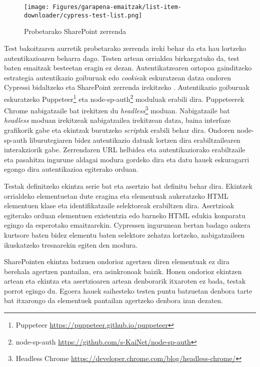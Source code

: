 \begin{figure}[H]
\vspace{0.75cm}
\centering
\texttt{[image: Figures/garapena-emaitzak/list-item-downloader/cypress-test-list.png]}
\caption{Probetarako SharePoint zerrenda}
\label{cypress-test-list}
\end{figure}

Test bakoitzaren aurretik probetarako zerrenda ireki behar da eta hau lortzeko autentikazioaren beharra dago. Testen artean orrialdea birkargatuko da, test baten emaitzak besteetan eragin ez dezan. Autentikatzearen oztopoa gainditzeko estrategia autentikazio goiburuak edo \textit{cookie}ak eskuratzean datza ondoren Cypressi bidaltzeko eta SharePoint zerrenda irekitzeko \cite{cypress-testing-spfx}. Autentikazio goiburuak eskuratzeko Puppeteer\footnote{Puppeteer \url{https://puppeteer.github.io/puppeteer}} eta node-sp-auth\footnote{node-sp-auth \url{https://github.com/s-KaiNet/node-sp-auth}} moduluak erabili dira. Puppeteerek Chrome nabigatzaile bat irekitzen du \textit{headless}\footnote{Headless Chrome \url{https://developer.chrome.com/blog/headless-chrome/}} moduan. Nabigatzaile bat \textit{headless} moduan irekitzeak nabigatzailea irekitzean datza, baina interfaze grafikorik gabe eta ekintzak burutzeko \textit{script}ak erabili behar dira. Ondoren node-sp-auth liburutegiaren bidez autentikazio datuak lortzen dira erabiltzailearen interakziorik gabe. Zerrendaren URL helbidea eta autentikaziorako erabiltzaile eta pasahitza ingurune aldagai modura gordeko dira eta datu hauek eskuragarri egongo dira autentikazioa egiterako orduan. 

\vspace{1cm}
Testak definitzeko ekintza serie bat eta asertzio bat definitu behar dira. Ekintzek orrialdeko elementuetan dute eragina eta elementuak aukeratzeko HTML elementuen klase eta identifikatzaile selektoreak erabiltzen dira. 
Asertzioak egiterako orduan elementuen existentzia edo barneko HTML edukia konparatu egingo da esperotako emaitzarekin. Cypressen ingurunean bertan badago aukera kurtsore baten bidez elementu baten selektore zehatza lortzeko, nabigatzaileen ikuskatzeko tresnarekin egiten den modura.

SharePointen ekintza batzuen ondorioz agertzen diren elementuak ez dira berehala agertzen pantailan, era asinkronoak baizik. Honen ondorioz ekintzen artean eta ekintza eta asertzioaren artean denborarik itxaroten ez bada, testak porrot egingo du. Egoera hauek saihesteko testen puntu batzuetan denbora tarte bat itxarongo da elementuek pantailan agertzeko denbora izan dezaten. 

